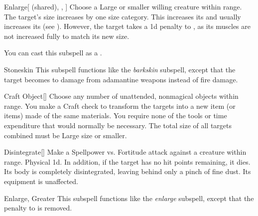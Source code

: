 \begin{ability}[\nth{3}]{Enlarge}[ (shared), , ]
Choose a Large or smaller willing creature within \rngclose range.
The target's size increases by one size category.
This increases its  and usually increases its  (see ).
However, the target takes a \minus1d penalty to , as its muscles are not increased fully to match its new size.

You can cast this subspell as a .
\end{ability}
\vspace{0.25em}


\begin{ability}[\nth{3}]{Stoneskin}
This subspell functions like the \textit{barkskin} subspell, except that the target becomes  to damage from adamantine weapons instead of fire damage.
\end{ability}
\vspace{0.25em}


\begin{ability}[\nth{4}]{Craft Object}[]
Choose any number of unattended, nonmagical objects within \rngclose range.
You make a Craft check to transform the targets into a new item (or items) made of the same materials.
You require none of the tools or time expenditure that would normally be necessary.
The total size of all targets combined must be Large size or smaller.
\end{ability}
\vspace{0.25em}


\begin{ability}[\nth{6}]{Disintegrate}[]
Make a Spellpower vs. Fortitude attack against a creature within \rngmed range.
\hit Physical  \plus1d.
In addition, if the target has no hit points remaining, it dies.
Its body is completely disintegrated, leaving behind only a pinch of fine dust.
Its equipment is unaffected.
\end{ability}
\vspace{0.25em}


\begin{ability}[\nth{6}]{Enlarge, Greater}
This subspell functions like the \textit{enlarge} subspell, except that the penalty to  is removed.
\end{ability}
\vspace{0.25em}


